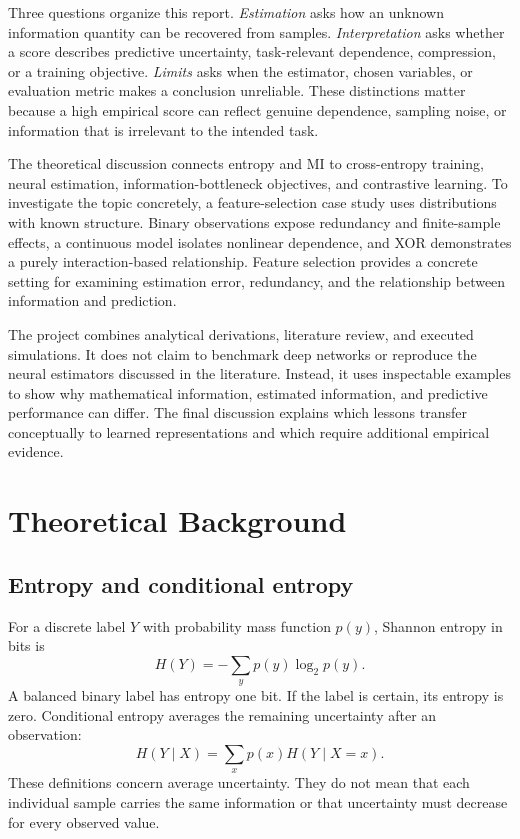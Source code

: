 \documentclass[journal,11pt]{IEEEtran}
\begin{document}
Three questions organize this report. \emph{Estimation} asks how an unknown information quantity can be recovered from samples. \emph{Interpretation} asks whether a score describes predictive uncertainty, task-relevant dependence, compression, or a training objective. \emph{Limits} asks when the estimator, chosen variables, or evaluation metric makes a conclusion unreliable. These distinctions matter because a high empirical score can reflect genuine dependence, sampling noise, or information that is irrelevant to the intended task.

The theoretical discussion connects entropy and MI to cross-entropy training, neural estimation, information-bottleneck objectives, and contrastive learning. To investigate the topic concretely, a feature-selection case study uses distributions with known structure. Binary observations expose redundancy and finite-sample effects, a continuous model isolates nonlinear dependence, and XOR demonstrates a purely interaction-based relationship. Feature selection provides a concrete setting for examining estimation error, redundancy, and the relationship between information and prediction.

The project combines analytical derivations, literature review, and executed simulations. It does not claim to benchmark deep networks or reproduce the neural estimators discussed in the literature. Instead, it uses inspectable examples to show why mathematical information, estimated information, and predictive performance can differ. The final discussion explains which lessons transfer conceptually to learned representations and which require additional empirical evidence.

\section{Theoretical Background}
\subsection{Entropy and conditional entropy}
For a discrete label $Y$ with probability mass function $p(y)$, Shannon entropy in bits is
\begin{equation}
H(Y)=-\sum_y p(y)\log_2 p(y).
\end{equation}
A balanced binary label has entropy one bit. If the label is certain, its entropy is zero. Conditional entropy averages the remaining uncertainty after an observation:
\begin{equation}
H(Y\mid X)=\sum_x p(x)H(Y\mid X=x).
\end{equation}
These definitions concern average uncertainty. They do not mean that each individual sample carries the same information or that uncertainty must decrease for every observed value.
\end{document}
